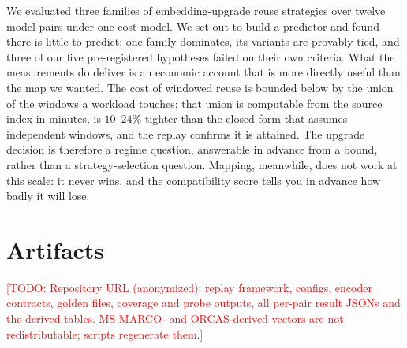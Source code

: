 \documentclass[conference]{IEEEtran}
\newcommand{\todo}[1]{\textcolor{red}{[TODO: #1]}}
\begin{document}
We evaluated three families of embedding-upgrade reuse strategies over twelve model pairs
under one cost model. We set out to build a predictor and found there is little to
predict: one family dominates, its variants are provably tied, and three of our five
pre-registered hypotheses failed on their own criteria. What the measurements do deliver
is an economic account that is more directly useful than the map we wanted. The cost of
windowed reuse is bounded below by the union of the windows a workload touches; that union is
computable from the source index in minutes, is $10$--$24\%$ tighter than the closed form that
assumes independent windows, and the replay confirms it is attained. The upgrade decision is
therefore a regime question, answerable in advance from a bound, rather than a
strategy-selection question. Mapping, meanwhile, does not work at
this scale: it never wins, and the compatibility score tells you in advance how badly it
will lose.

\section*{Artifacts}
\todo{Repository URL (anonymized): replay framework, configs, encoder contracts, golden
files, coverage and probe outputs, all per-pair result JSONs and the derived tables. MS
MARCO- and ORCAS-derived vectors are not redistributable; scripts regenerate them.}
\end{document}
